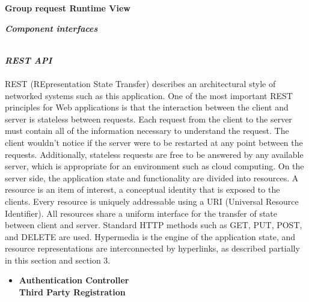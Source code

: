 \begin{legal}
\begin{legal}
				\newpage
				\item \textbf{Group request Runtime View}\\
			\end {legal}
		\item \textit{\textbf{Component interfaces}}\\\\
			\begin{legal} 
				\item \textit{\textbf{REST API}}\\\\
				REST (REpresentation State Transfer) describes an architectural style of networked systems such as this application. One of the most important REST principles for Web applications is that the interaction between the client and server is stateless between requests. Each request from the client to the server must contain all of the information necessary to understand the request. The client wouldn't notice if the server were to be restarted at any point between the requests. Additionally, stateless requests are free to be answered by any available server, which is appropriate for an environment such as cloud computing. On the server side, the application state and functionality are divided into resources. A resource is an item of interest, a conceptual identity that is exposed to the clients. Every resource is uniquely addressable using a URI (Universal Resource Identifier). All resources share a uniform interface for the transfer of state between client and server. Standard HTTP methods such as GET, PUT, POST, and DELETE are used. Hypermedia is the engine of the application state, and resource representations are interconnected by hyperlinks, as described partially in this section and section 3.

					\begin{itemize}
						\item \textbf{Authentication Controller} \\
				
						\textbf{Third Party Registration} \\
			

\end{itemize}
\end{legal}
\end{legal}
